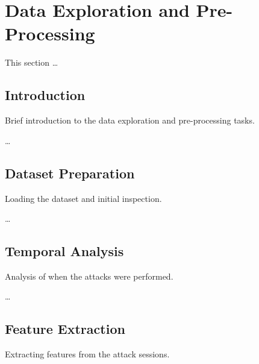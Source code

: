 

\section{Data Exploration and Pre-Processing}

    This section \ldots

    \subsection{Introduction}

        Brief introduction to the data exploration and pre-processing tasks.

        \ldots

    \subsection{Dataset Preparation}
    
        Loading the dataset and initial inspection.

        \ldots

    \subsection{Temporal Analysis}
    
        Analysis of when the attacks were performed.

        \ldots

    \subsection{Feature Extraction}
    
        Extracting features from the attack sessions.

